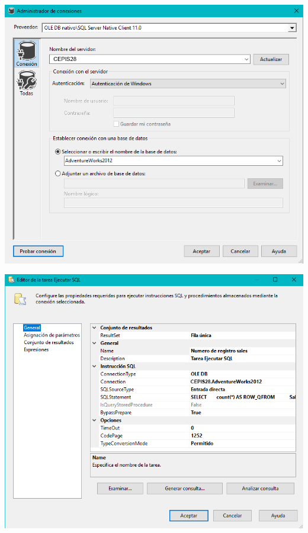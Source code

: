 \begin{itemize}
	\begin{center}
	\includegraphics[width=14cm]{./Imagenes/tarea2_7}
	\end{center}

	\begin{center}
	\includegraphics[width=14cm]{./Imagenes/tarea2_8}
	\end{center}


\end{itemize}
